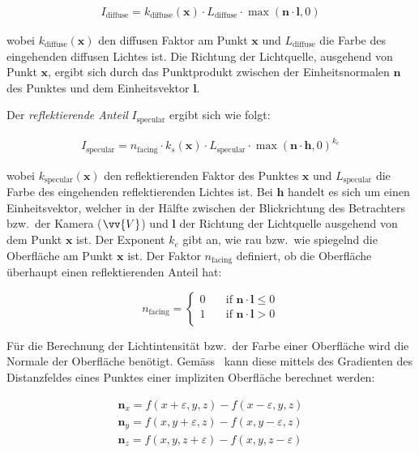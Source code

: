 \begin{gather}
    I_{\text{diffuse}} = k_{\text{diffuse}}(\bm{x}) \cdot L_{\text{diffuse}} \cdot \max(\bm{n} \cdot \bm{l}, 0)
\end{gather}

wobei $k_{\text{diffuse}}(\bm{x})$ den diffusen Faktor am Punkt $\bm{x}$
und $L_{\text{diffuse}}$ die Farbe des eingehenden diffusen Lichtes ist.
Die Richtung der Lichtquelle, ausgehend von Punkt $\bm{x}$, ergibt sich
durch das Punktprodukt zwischen der Einheitsnormalen $\bm{n}$ des
Punktes und dem Einheitsvektor $\bm{l}$.

Der \textit{reflektierende Anteil} $I_{\text{specular}}$ ergibt sich
wie folgt:

\begin{gather}
    I_{\text{specular}} = n_{\text{facing}} \cdot k_{s}(\bm{x}) \cdot L_{\text{specular}} \cdot \max{(\bm{n} \cdot \bm{h}, 0)}^{k_{e}}
\end{gather}

wobei $k_{\text{specular}}(\bm{x})$ den reflektierenden Faktor des
Punktes $\bm{x}$ und $L_{\text{specular}}$ die Farbe des eingehenden
reflektierenden Lichtes ist. Bei $\bm{h}$ handelt es sich um einen
Einheitsvektor, welcher in der Hälfte zwischen der Blickrichtung des
Betrachters bzw.\ der Kamera ($\vv{V}$) und $\bm{l}$ der Richtung der
Lichtquelle ausgehend von dem Punkt $\bm{x}$ ist. Der Exponent $k_{e}$
gibt an, wie rau bzw.\ wie spiegelnd die Oberfläche am Punkt $\bm{x}$
ist. Der Faktor $n_{\text{facing}}$ definiert, ob die Oberfläche
überhaupt einen reflektierenden Anteil hat:

\begin{equation}
    n_{\text{facing}} = \begin{cases}
        0 & \quad \text{if } \bm{n} \cdot \bm{l} \leq 0\\
        1 & \quad \text{if } \bm{n} \cdot \bm{l} > 0 \\
    \end{cases}
\end{equation}

Für die Berechnung der Lichtintensität bzw.\ der Farbe einer Oberfläche
wird die Normale der Oberfläche benötigt. Gemäss~\cite{hart_ray_1989}
kann diese mittels des Gradienten des Distanzfeldes
eines Punktes einer impliziten Oberfläche berechnet werden:

\begin{gather}
    \bm{n}_{x} = f(x + \varepsilon, y, z) - f(x - \varepsilon, y, z) \\
    \bm{n}_{y} = f(x, y + \varepsilon,  z) - f(x, y - \varepsilon,  z) \\
    \bm{n}_{z} = f(x, y, z + \varepsilon) - f(x, y, z - \varepsilon) \\
\end{gather}

